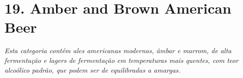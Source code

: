 \section*{19. Amber and Brown American Beer}
\textit{Esta categoria contém ales americanas modernas, âmbar e marrom, de alta fermentação e lagers de fermentação em temperaturas mais quentes, com teor alcoólico padrão, que podem ser de equilibradas a amargas.}
